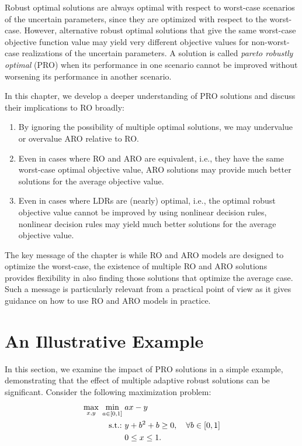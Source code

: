 
Robust optimal solutions are always optimal with respect to worst-case scenarios of the uncertain parameters, since they are optimized with respect to the worst-case. However, alternative robust optimal solutions that give the same worst-case objective function value may yield very different objective values for non-worst-case realizations of the uncertain parameters. A solution is called \textit{pareto robustly optimal} (PRO) when its performance in one scenario cannot be improved without worsening its performance in another scenario.

In this chapter, we develop a deeper understanding of PRO solutions and discuss their implications to RO broadly:
 \begin{enumerate}
 	\item By ignoring the possibility of multiple optimal solutions, we may undervalue or overvalue ARO relative to RO.
 	\item Even in cases where RO and ARO are equivalent, i.e., they have the same worst-case optimal objective value, ARO solutions may provide much better solutions for the average objective value.
 	\item Even in cases where LDRs are (nearly) optimal, i.e., the optimal robust objective value cannot be improved by using nonlinear decision rules, nonlinear decision rules may yield much better solutions for the average objective value. 
 \end{enumerate}
 
 The key message of the chapter is while RO and ARO models are designed to optimize the worst-case, the existence of multiple RO and ARO solutions provides flexibility in also finding those solutions that optimize the average case. Such a message is particularly relevant from a practical point of view as it gives guidance on how to use RO and ARO models in practice.
 
\section{An Illustrative Example}

In this section, we examine the impact of PRO solutions in a simple example, demonstrating that the effect of multiple adaptive robust solutions can be significant.  Consider the following maximization problem:
\begin{align}\label{p4c3:illustexample}
\max_{x,y}\;\min_{a\in [0,1]}\; & ax - y\\
\mathop{\text{s.t.:~}} & y + b^2 + b \geq 0, \quad \forall b\in[0,1] \\
& 0\leq x \leq 1.
\end{align}

